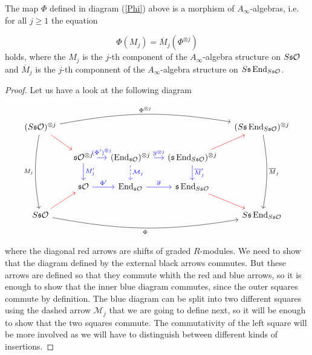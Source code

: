 \documentclass[Thesis.tex]{subfiles}
\begin{document}
\begin{thm}\label{theorem}
The map $\Phi$ defined in diagram (\ref{Phi}) above is a morphism of $A_\infty$-algebras, i.e. for all $j\geq 1$ the equation

\[\Phi(M_j)=\overline{M}_j(\Phi^{\otimes j})\]
holds, where the $M_j$ is the $j$-th component of the $A_\infty$-algebra structure on $S\mathfrak{s}{\mathcal O}$ and $\overline{M}_j$ is the $j$-th componnent of the $A_\infty$-algebra structure on $S\mathfrak{s}\operatorname{End}_{S\mathfrak{s}{\mathcal O}}$. 
\end{thm}
\begin{proof}
Let us have a look at the following diagram

\begin{equation}\label{proofdiagram}
\begin{tikzcd}[column sep = 1.2em]
(S\s\OO)^{\otimes j}\arrow[dr,red] \arrow[ddd, bend right=10,"M_j"']\arrow[rrrr,bend left=10, "\Phi^{\otimes j}"]& & & & (S\s\End_{S\s\OO})^{\otimes j}\arrow[ddd, bend left=10, "\overline{M}_j"]\\
&\s\OO^{\otimes j}\arrow[r,blue, "(\Phi')^{\otimes j}"]\arrow[d, blue, "M'_j"] & (\End_{\s\OO})^{\otimes j}\arrow[r, blue,"\overline{\sigma}^{\otimes j}"] \arrow[d, dashed, "\mathcal{M}_j",blue]& (\s\End_{S\s\OO})^{\otimes j}\arrow[ur,red]\arrow[d, "\overline{M}'_j",blue]& \\
&\s\OO\arrow[r, blue, "\Phi'"]& \End_{\s\OO} \arrow[r, blue, "\overline{\sigma}"] & \s\End_{S\s\OO}\arrow[dr,red]& \\
S\s\OO\arrow[rrrr, bend right=10, "\Phi"']\arrow[ur,red]& & & & S\s\End_{S\s\OO}
\end{tikzcd}
\end{equation}

where the diagonal red arrows are shifts of graded $R$-modules. We need to show that the diagram defined by the external black arrows commutes. But these arrows are defined so that they commute whith the red and blue arrows, so it is enough to show that the inner blue diagram commutes, since the outer squares commute by definition. The blue diagram can be split into two different squares using the dashed arrow $\mathcal{M}_j$ that we are going to define next, so it will be enough to show that the two squares commute. The commutativity of the  left square will be more involved as we will have to distinguish between different kinds of insertions.


\end{proof}
\end{document}
